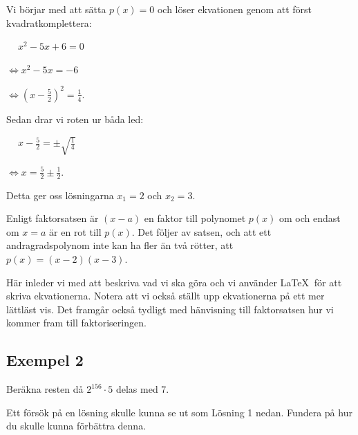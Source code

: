 \documentclass[titlepage]{article}
\begin{document}
\begin{center}
\begin{tcolorbox}[width=\linewidth,colback={green!25!white},title={\textbf{Lösning 2 - Bättre}},outer arc=0mm,colupper=black]    
    Vi börjar med att sätta $p(x)=0$ och löser ekvationen genom att först kvadratkomplettera:
    \vspace{2mm}

    $\quad \: x^2-5x+6 = 0$

    $\Leftrightarrow x^2-5x = -6$

    $\Leftrightarrow(x-\frac{5}{2})^2 = \frac{1}{4}$.
    \vspace{2mm}

    Sedan drar vi roten ur båda led:
    \vspace{2mm}

    $\quad \: x-\frac{5}{2} = \pm \sqrt{\frac{1}{4}}$

    $\Leftrightarrow x = \frac{5}{2} \pm \frac{1}{2}$.
    \vspace{2mm}

    Detta ger oss lösningarna $x_1 = 2$ och $x_2=3$.

    Enligt faktorsatsen är $(x-a)$ en faktor till polynomet $p(x)$ om och endast om $x = a$ är en rot till $p(x)$. Det följer av satsen, och att ett andragradspolynom inte kan ha fler än två rötter, att $p(x) = (x-2)(x-3)$.
\end{tcolorbox} 
\end{center}

Här inleder vi med att beskriva vad vi ska göra och vi använder \LaTeX$\:$ för att skriva ekvationerna. Notera att vi också ställt upp ekvationerna på ett mer lättläst vis. Det framgår också tydligt med hänvisning till faktorsatsen hur vi kommer fram till faktoriseringen.


\subsection*{Exempel 2}

\begin{center}
\begin{tcolorbox}[width=\linewidth,colback={white},title={\textbf{Problem}},outer arc=0mm,colupper=black]
    Beräkna resten då $2^{156}\cdot5$ delas med $7$.
\end{tcolorbox} 
\end{center}

Ett försök på en lösning skulle kunna se ut som Lösning 1 nedan. Fundera på hur du skulle kunna förbättra denna.
\end{document}

